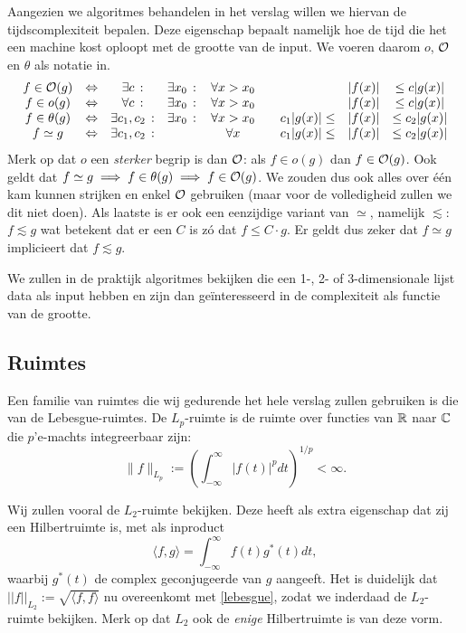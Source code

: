 Aangezien we algoritmes behandelen in het verslag willen we hiervan de tijdscomplexiteit bepalen.
Deze eigenschap bepaalt namelijk hoe de tijd die het een machine kost oploopt met de grootte van de input.
We voeren daarom $o$, $\mathcal{O}$ en $\theta$ als notatie in.
\begin{equation*}
\begin{array}{cccccccc}
  f \in \mathcal{O}(g)     &\Leftrightarrow& \exists c     \,:&\exists x_0  \,:&\, 
  \forall x>x_0 \quad&& |f(x)| &\leq c|g(x)|  \\
  f \in o(g)      &\Leftrightarrow& \forall c     \,:&\exists x_0  \,:&\, 
  \forall x>x_0 \quad&& |f(x)| &\leq c |g(x)| \\ 
  f \in \theta(g) &\Leftrightarrow& \exists c_1,c_2\,:&\exists x_0  \,:&\, 
  \forall x>x_0 \quad& c_1|g(x)| \leq & |f(x)| &\leq c_2|g(x)|  \\
  f \simeq g & \Leftrightarrow& \exists c_1,c_2\,:& \,&\, 
  \forall x \quad& c_1|g(x)| \leq & |f(x)| &\leq c_2|g(x)| 

\end{array}
\end{equation*}
Merk op dat $o$ een \emph{sterker} begrip is dan $\mathcal{O}$: als $f \in o(g)$ dan $f \in \mathcal{O}(g)$. Ook geldt dat $f\simeq g \implies f\in\theta(g) \implies f \in \mathcal{O}(g)$. We zouden dus ook alles over \'e\'en kam kunnen strijken en enkel $\mathcal{O}$ gebruiken (maar voor de volledigheid zullen we dit niet doen). Als laatste is er ook een eenzijdige variant van $\simeq$, namelijk $\lesssim$: $f \lesssim g$ wat betekent dat er een $C$ is z\'o dat $f \leq C \cdot g$. Er geldt dus zeker dat $f\simeq g$ implicieert dat $f\lesssim g$.

We zullen in de praktijk algoritmes bekijken die een 1-, 2- of 3-dimensionale lijst data als input hebben en zijn dan ge\"interesseerd in de complexiteit als functie van de grootte.

\subsection{Ruimtes}
\label{ruimtes}
Een familie van ruimtes die wij gedurende het hele verslag zullen gebruiken is die van de Lebesgue-ruimtes. De $L_p$-ruimte is de ruimte over functies van $\mathbb{R}$ naar $\mathbb{C}$ die $p$'e-machts integreerbaar zijn:
\begin{equation}
	\label{lebesgue}
	\| f \|_{L_p} := \left(\int_{-\infty}^\infty |f(t)|^p dt\right)^{1/p} < \infty.
\end{equation}

Wij zullen vooral de $L_2$-ruimte bekijken. Deze heeft als extra eigenschap dat zij een Hilbertruimte is, 
met als inproduct
\begin{equation}
	\label{l2}
	\langle f, g \rangle = \int_{-\infty}^\infty f(t) g^*(t) dt,
\end{equation}
waarbij $g^*(t)$ de complex geconjugeerde van $g$ aangeeft.
Het is duidelijk dat $ || f ||_{L_2} := \sqrt{\langle f, f \rangle}$ nu overeenkomt met \eqref{lebesgue}, zodat we inderdaad de $L_2$-ruimte bekijken. Merk op dat $L_2$ ook de \emph{enige} Hilbertruimte is van deze vorm.

